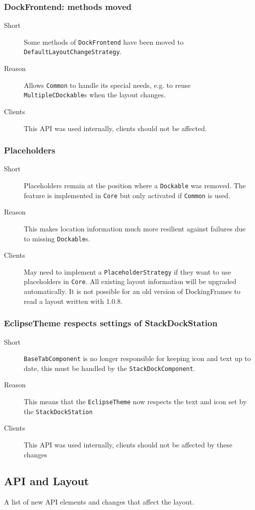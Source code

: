 \documentclass[a4paper,10pt]{article}
\newcommand{\src}[1]{\lstinline[basicstyle=\normalsize\ttfamily,keywordstyle=\normalsize\ttfamily,identifierstyle=\normalsize\ttfamily]|#1|}
\newcommand{\short}{\item[Short]}
\newcommand{\why}{\item[Reason]}
\newcommand{\clients}{\item[Clients]}
\begin{document}
\subsubsection{DockFrontend: methods moved}
\begin{description}
 \short Some methods of \src{DockFrontend} have been moved to \linebreak \src{DefaultLayoutChangeStrategy}.
 \why Allows \src{Common} to handle its special needs, e.g. to reuse \linebreak \src{MultipleCDockable}s when the layout changes.
 \clients This API was used internally, clients should not be affected.
\end{description}

\subsubsection{Placeholders}
\begin{description}
 \short Placeholders remain at the position where a \src{Dockable} was removed. The feature is implemented in \src{Core} but only activated if \src{Common} is used.
 \why This makes location information much more resilient against failures due to missing \src{Dockable}s.
 \clients May need to implement a \src{PlaceholderStrategy} if they want to use placeholders in \src{Core}. All existing layout information will be upgraded automatically. It is not possible for an old version of DockingFrames to read a layout written with 1.0.8.
\end{description}

\subsubsection{EclipseTheme respects settings of StackDockStation}
\begin{description}
 \short \src{BaseTabComponent} is no longer responsible for keeping icon and text up to date, this must be handled by the \src{StackDockComponent}. 
 \why This means that the \src{EclipseTheme} now respects the text and icon set by the \src{StackDockStation}
 \clients This API was used internally, clients should not be affected by these changes
\end{description}



\subsection{API and Layout}
A list of new API elements and changes that affect the layout.
\end{document}
